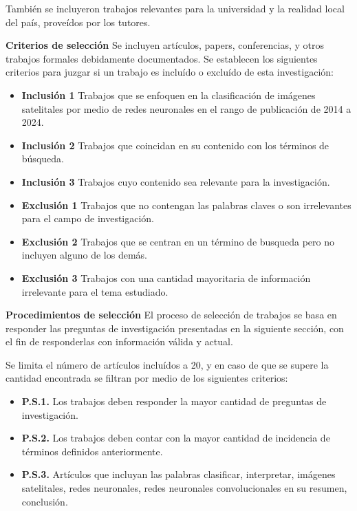 También se incluyeron trabajos relevantes para la universidad y la realidad local del país, proveídos por los tutores.

{\bf Criterios de selección} Se incluyen artículos, papers, conferencias, y otros trabajos formales debidamente
documentados. Se establecen los siguientes criterios para juzgar si un trabajo es incluído o excluído de esta
investigación:
\begin{itemize}
    \item[] {\bf Inclusión 1} Trabajos que se enfoquen en la clasificación de imágenes satelitales por medio de redes
        neuronales en el rango de publicación de 2014 a 2024.
    \item[] {\bf Inclusión 2} Trabajos que coincidan en su contenido con los términos de búsqueda.
    \item[] {\bf Inclusión 3} Trabajos cuyo contenido sea relevante para la investigación.
    \item[] {\bf Exclusión 1} Trabajos que no contengan las palabras claves o son irrelevantes para el campo de
        investigación.
    \item[] {\bf Exclusión 2} Trabajos que se centran en un término de busqueda pero no incluyen alguno de los demás.
    \item[] {\bf Exclusión 3} Trabajos con una cantidad mayoritaria de información irrelevante para el tema estudiado.
\end{itemize}

{\bf Procedimientos de selección} El proceso de selección de trabajos se basa en responder las preguntas de
investigación presentadas en la siguiente sección, con el fin de responderlas con información válida y actual.

Se limita el número de artículos incluídos a 20, y en caso de que se supere la cantidad encontrada se filtran por medio
de los siguientes criterios:

\begin{itemize}
    \item[] {\bf P.S.1.} Los trabajos deben responder la mayor cantidad de preguntas de investigación.
    \item[] {\bf P.S.2.} Los trabajos deben contar con la mayor cantidad de incidencia de términos definidos
        anteriormente.
    \item[] {\bf P.S.3.} Artículos que incluyan las palabras clasificar, interpretar, imágenes satelitales, redes
        neuronales, redes neuronales convolucionales en su resumen, conclusión.
\end{itemize}

